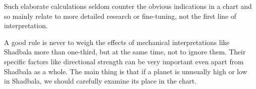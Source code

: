  

Such elaborate calculations seldom counter the obvious indications in a chart and so mainly relate to more detailed research or fine-tuning, not the first line of interpretation.

 

A good rule is never to weigh the effects of mechanical interpretations like Shadbala more than one-third, but at the same time, not to ignore them. Their specific factors like directional strength can be very important even apart from Shadbala as a whole. The main thing is that if a planet is unusually high or low in Shadbala, we should carefully examine its place in the chart.

 